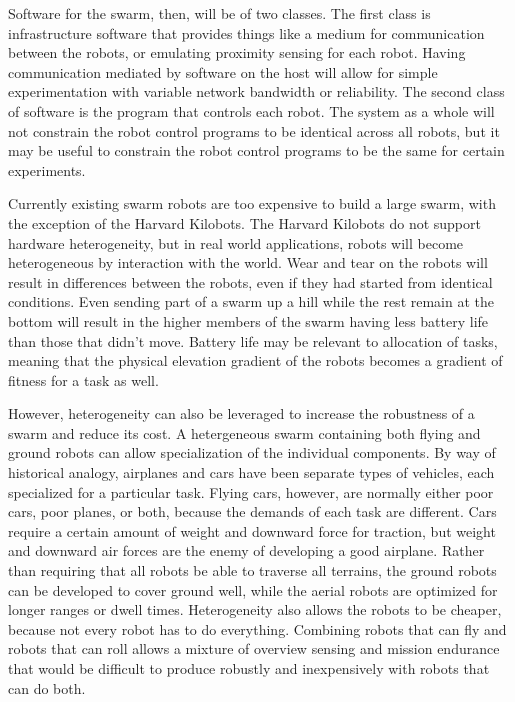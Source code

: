 \documentclass[]{article}
\begin{document}
Software for the swarm, then, will be of two classes. 
The first class is infrastructure software that provides things like a medium for communication between the robots, or emulating proximity sensing for each robot. 
Having communication mediated by software on the host will allow for simple experimentation with variable network bandwidth or reliability. 
The second class of software is the program that controls each robot. 
The system as a whole will not constrain the robot control programs to be identical across all robots, but it may be useful to constrain the robot control programs to be the same for certain experiments. 

Currently existing swarm robots are too expensive to build a large swarm, with the exception of the Harvard Kilobots. 
The Harvard Kilobots do not support hardware heterogeneity, but in real world applications, robots will become heterogeneous by interaction with the world. 
Wear and tear on the robots will result in differences between the robots, even if they had started from identical conditions. 
Even sending part of a swarm up a hill while the rest remain at the bottom will result in the higher members of the swarm having less battery life than those that didn't move. 
Battery life may be relevant to allocation of tasks, meaning that the physical elevation gradient of the robots becomes a gradient of fitness for a task as well. 

However, heterogeneity can also be leveraged to increase the robustness of a swarm and reduce its cost. 
A hetergeneous swarm containing both flying and ground robots can allow specialization of the individual components. 
By way of historical analogy, airplanes and cars have been separate types of vehicles, each specialized for a particular task. 
Flying cars, however, are normally either poor cars, poor planes, or both, because the demands of each task are different. 
Cars require a certain amount of weight and downward force for traction, but weight and downward air forces are the enemy of developing a good airplane. 
Rather than requiring that all robots be able to traverse all terrains, the ground robots can be developed to cover ground well, while the aerial robots are optimized for longer ranges or dwell times. 
Heterogeneity also allows the robots to be cheaper, because not every robot has to do everything.
Combining robots that can fly and robots that can roll allows a mixture of overview sensing and mission endurance that would be difficult to produce robustly and inexpensively with robots that can do both. 
\end{document}
